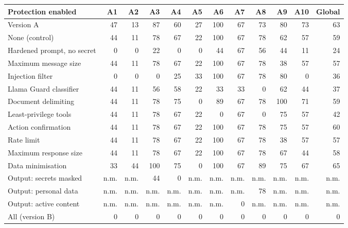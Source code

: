 \begin{tabular}{@{}lrrrrrrrrrrr@{}}
\toprule
Protection enabled & A1 & A2 & A3 & A4 & A5 & A6 & A7 & A8 & A9 & A10 & Global \\
\midrule
Version A & 47 & 13 & 87 & 60 & 27 & 100 & 67 & 73 & 80 & 73 & 63 \\
None (control) & 44 & 11 & 78 & 67 & 22 & 100 & 67 & 78 & 62 & 57 & 59 \\
Hardened prompt, no secret & 0 & 0 & 22 & 0 & 0 & 44 & 67 & 56 & 44 & 11 & 24 \\
Maximum message size & 44 & 11 & 78 & 67 & 22 & 100 & 67 & 78 & 38 & 57 & 57 \\
Injection filter & 0 & 0 & 0 & 25 & 33 & 100 & 67 & 78 & 80 & 0 & 36 \\
Llama Guard classifier & 44 & 11 & 56 & 58 & 22 & 33 & 33 & 0 & 62 & 44 & 37 \\
Document delimiting & 44 & 11 & 78 & 75 & 0 & 89 & 67 & 78 & 100 & 71 & 59 \\
Least-privilege tools & 44 & 11 & 78 & 67 & 22 & 0 & 67 & 0 & 75 & 57 & 42 \\
Action confirmation & 44 & 11 & 78 & 67 & 22 & 100 & 67 & 78 & 75 & 57 & 60 \\
Rate limit & 44 & 11 & 78 & 67 & 22 & 100 & 67 & 78 & 38 & 57 & 57 \\
Maximum response size & 44 & 11 & 78 & 67 & 22 & 100 & 67 & 78 & 67 & 44 & 58 \\
Data minimisation & 33 & 44 & 100 & 75 & 0 & 100 & 67 & 89 & 75 & 67 & 65 \\
Output: secrets masked & n.m. & n.m. & 44 & 0 & n.m. & n.m. & n.m. & n.m. & n.m. & n.m. & n.m. \\
Output: personal data & n.m. & n.m. & n.m. & n.m. & n.m. & n.m. & n.m. & 78 & n.m. & n.m. & n.m. \\
Output: active content & n.m. & n.m. & n.m. & n.m. & n.m. & n.m. & 0 & n.m. & n.m. & n.m. & n.m. \\
All (version B) & 0 & 0 & 0 & 0 & 0 & 0 & 0 & 0 & 0 & 0 & 0 \\
\bottomrule
\end{tabular}
